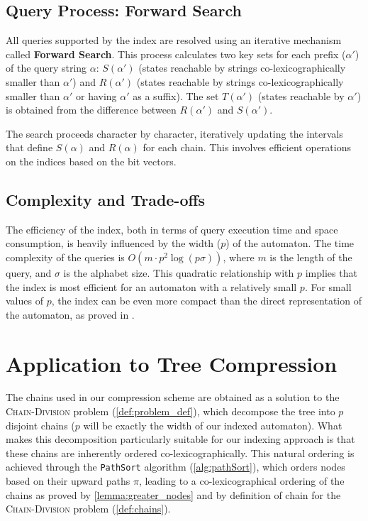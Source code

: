 \subsection{Query Process: Forward Search} 
All queries supported by the index are resolved using an iterative mechanism called \textbf{Forward Search}. This process calculates two key sets for each prefix ($\alpha'$) of the query string $\alpha$: $S(\alpha')$ (states reachable by strings co-lexicographically smaller than $\alpha'$) and $R(\alpha')$ (states reachable by strings co-lexicographically smaller than $\alpha'$ or having $\alpha'$ as a suffix). The set $T(\alpha')$ (states reachable by $\alpha'$) is obtained from the difference between $R(\alpha')$ and $S(\alpha')$.

The search proceeds character by character, iteratively updating the intervals that define $S(\alpha)$ and $R(\alpha)$ for each chain. This involves efficient operations on the indices based on the bit vectors.

\subsection{Complexity and Trade-offs} 
The efficiency of the index, both in terms of query execution time and space consumption, is heavily influenced by the width ($p$) of the automaton. The time complexity of the queries is $O(m \cdot p^2 \log(p\sigma))$, where $m$ is the length of the query, and $\sigma$ is the alphabet size. This quadratic relationship with $p$ implies that the index is most efficient for an automaton with a relatively small $p$. For small values of $p$, the index can be even more compact than the direct representation of the automaton, as proved in \cite{maso2023indexing}.

\section{Application to Tree Compression}
The chains used in our compression scheme are obtained as a solution to the \textsc{Chain-Division} problem (\cref{def:problem_def}), which decompose the tree into $p$ disjoint chains ($p$ will be exactly the width of our indexed automaton). What makes this decomposition particularly suitable for our indexing approach is that these chains are inherently ordered co-lexicographically. This natural ordering is achieved through the \texttt{PathSort} algorithm (\cref{alg:pathSort}), which orders nodes based on their upward paths $\pi$, leading to a co-lexicographical ordering of the chains as proved by \cref{lemma:greater_nodes} and by definition of chain for the \textsc{Chain-Division} problem (\cref{def:chains}).

